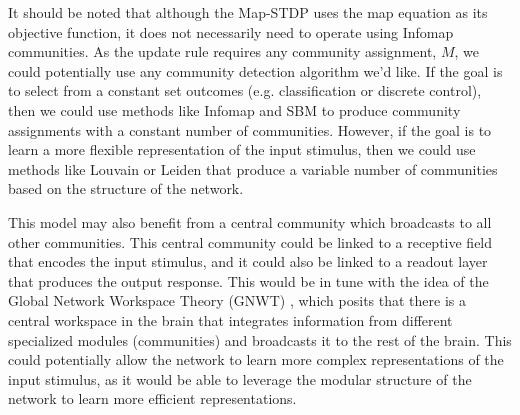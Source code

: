 \documentclass[pdflatex,sn-mathphys-num]{sn-jnl}%
\theoremstyle{thmstyleone}%
\theoremstyle{thmstyletwo}%
\theoremstyle{thmstylethree}%
\begin{document}
It should be noted that although the Map-STDP uses the map equation as its objective function, it does not necessarily need to operate using Infomap communities. As the update rule requires any community assignment, $M$, we could potentially use any community detection algorithm we'd like. If the goal is to select from a constant set outcomes (e.g. classification or discrete control), then we could use methods like Infomap and SBM to produce community assignments with a constant number of communities. However, if the goal is to learn a more flexible representation of the input stimulus, then we could use methods like Louvain or Leiden that produce a variable number of communities based on the structure of the network.

This model may also benefit from a central community which broadcasts to all other communities. This central community could be linked to a receptive field that encodes the input stimulus, and it could also be linked to a readout layer that produces the output response. This would be in tune with the idea of the Global Network Workspace Theory (GNWT) \cite{Baars2005-zv}, which posits that there is a central workspace in the brain that integrates information from different specialized modules (communities) and broadcasts it to the rest of the brain. This could potentially allow the network to learn more complex representations of the input stimulus, as it would be able to leverage the modular structure of the network to learn more efficient representations.


\end{document}
